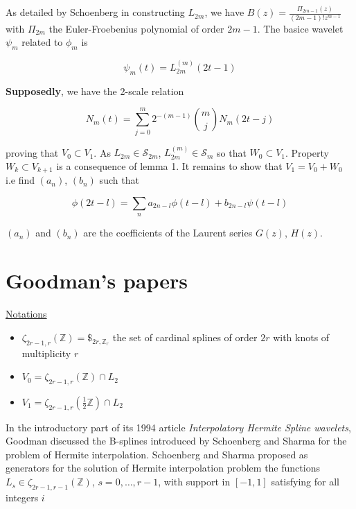 \documentclass[a4paper, 11pt]{article}
\begin{document}
As detailed by Schoenberg in constructing $L_{2m}$, we have $B(z) = \frac{\Pi_{2m-1}(z)}{(2m-1)!z^{m-1}}$ with 
$\Pi_{2m}$ the Euler-Froebenius polynomial of order $2m-1$. The basice wavelet $\psi_m$ related to $\phi_m$ is 

\begin{equation}
  \psi_m(t) = L_{2m}^{(m)}(2t-1)
\end{equation}

\textbf{Supposedly}, we have the 2-scale relation

\begin{equation}
    N_m(t) = \sum_{j=0}^m 2^{-(m-1)} \binom{m}{j} N_m(2t-j)
\end{equation}

proving that $V_0 \subset V_1$. As $L_{2m} \in \mathcal{S}_{2m}$, $L_{2m}^{(m)} \in \mathcal{S}_m$ so that $W_0 \subset 
V_1$. Property $W_k \subset V_{k+1}$ is a consequence of lemma 1. It remains to show that $V_1 = V_0 + W_0$ i.e find 
$(a_n)$, $(b_n)$ such that

\begin{equation*}
  \phi(2t-l) = \sum_n a_{2n-l} \phi(t-l) + b_{2n-l} \psi(t-l)
\end{equation*}

$(a_n)$ and $(b_n)$ are the coefficients of the Laurent series $G(z)$, $H(z)$.

\section{Goodman's papers}

\underline{Notations}
\begin{itemize}
  \item $\zeta_{2r-1, r}(\mathbb{Z}) = \$_{2r, \mathbb{Z}_r}$ the set of cardinal splines of order $2r$ with knots of 
    multiplicity $r$
  \item $V_0 = \zeta_{2r-1, r}(\mathbb{Z}) \cap L_2$
  \item $V_1 = \zeta_{2r-1, r}(\frac{1}{2}\mathbb{Z}) \cap L_2$
\end{itemize}

In the introductory part of its 1994 article \emph{Interpolatory Hermite Spline wavelets}, Goodman discussed the 
B-splines introduced by Schoenberg and Sharma for the problem of Hermite interpolation. Schoenberg and Sharma proposed 
as generators for the solution of Hermite interpolation problem the functions $L_s \in \zeta_{2r-1, r-1}(\mathbb{Z})$, 
$s=0, \ldots, r-1$, with support in $[-1,1]$ satisfying for all integers $i$
\end{document}
